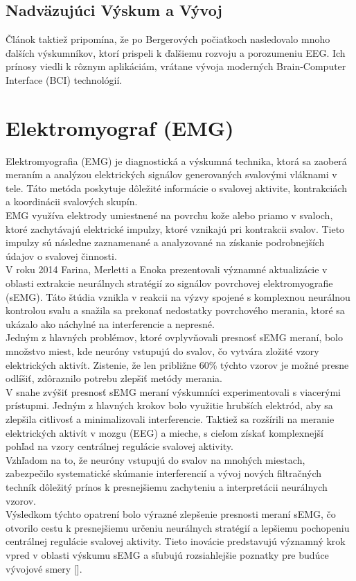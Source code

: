 \subsection{Nadväzujúci Výskum a Vývoj}
\tab[5 mm] Článok taktiež pripomína, že po Bergerových počiatkoch nasledovalo mnoho ďalších výskumníkov, ktorí prispeli k ďalšiemu rozvoju a porozumeniu EEG. Ich prínosy viedli k rôznym aplikáciám, vrátane vývoja moderných Brain-Computer Interface (BCI) technológií.


\section{Elektromyograf (EMG)}
\tab[5 mm] Elektromyografia (EMG) je diagnostická a výskumná technika, ktorá sa zaoberá meraním a analýzou elektrických signálov generovaných svalovými vláknami v tele. Táto metóda poskytuje dôležité informácie o svalovej aktivite, kontrakciách a koordinácii svalových skupín.\\
\tab[5 mm] EMG využíva elektrody umiestnené na povrchu kože alebo priamo v svaloch, ktoré zachytávajú elektrické impulzy, ktoré vznikajú pri kontrakcii svalov. Tieto impulzy sú následne zaznamenané a analyzované na získanie podrobnejších údajov o svalovej činnosti.\\
\tab[5 mm] V roku 2014 Farina, Merletti a Enoka \cite{doi:10.1152/japplphysiol.00162.2014} prezentovali významné aktualizácie v oblasti extrakcie neurálnych stratégií zo signálov povrchovej elektromyografie (sEMG). Táto štúdia vznikla v reakcii na výzvy spojené s komplexnou neurálnou kontrolou svalu a snažila sa prekonať nedostatky povrchového merania, ktoré sa ukázalo ako náchylné na interferencie a nepresné.\\
\tab[5 mm] Jedným z hlavných problémov, ktoré ovplyvňovali presnosť sEMG meraní, bolo množstvo miest, kde neuróny vstupujú do svalov, čo vytvára zložité vzory elektrických aktivít. Zistenie, že len približne 60\% týchto vzorov je možné presne odlíšiť, zdôraznilo potrebu zlepšiť metódy merania.\\
\tab[5 mm] V snahe zvýšiť presnosť sEMG meraní výskumníci experimentovali s viacerými prístupmi. Jedným z hlavných krokov bolo využitie hrubších elektród, aby sa zlepšila citlivosť a minimalizovali interferencie. Taktiež sa rozšírili na meranie elektrických aktivít v mozgu (EEG) a mieche, s cieľom získať komplexnejší pohľad na vzory centrálnej regulácie svalovej aktivity.\\
\tab[5 mm] Vzhľadom na to, že neuróny vstupujú do svalov na mnohých miestach, zabezpečilo systematické skúmanie interferencií a vývoj nových filtračných techník dôležitý prínos k presnejšiemu zachyteniu a interpretácii neurálnych vzorov.\\
\tab[5 mm] Výsledkom týchto opatrení bolo výrazné zlepšenie presnosti meraní sEMG, čo otvorilo cestu k presnejšiemu určeniu neurálnych stratégií a lepšiemu pochopeniu centrálnej regulácie svalovej aktivity. Tieto inovácie predstavujú významný krok vpred v oblasti výskumu sEMG a sľubujú rozsiahlejšie poznatky pre budúce vývojové smery [\cite{doi:10.1152/japplphysiol.00162.2014}].

